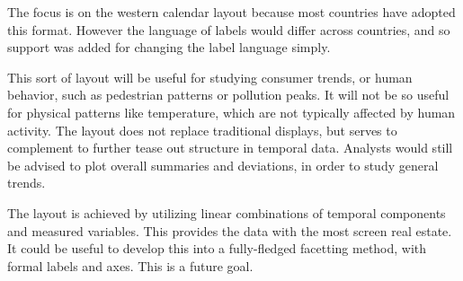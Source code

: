\documentclass[article]{jss}
\theoremstyle{definition}
\theoremstyle{definition}
\theoremstyle{remark}
\begin{document}
The focus is on the western calendar layout because most countries have
adopted this format. However the language of labels would differ across
countries, and so support was added for changing the label language
simply.

This sort of layout will be useful for studying consumer trends, or
human behavior, such as pedestrian patterns or pollution peaks. It will
not be so useful for physical patterns like temperature, which are not
typically affected by human activity. The layout does not replace
traditional displays, but serves to complement to further tease out
structure in temporal data. Analysts would still be advised to plot
overall summaries and deviations, in order to study general trends.

The layout is achieved by utilizing linear combinations of temporal
components and measured variables. This provides the data with the most
screen real estate. It could be useful to develop this into a
fully-fledged facetting method, with formal labels and axes. This is a
future goal.


\end{document}
